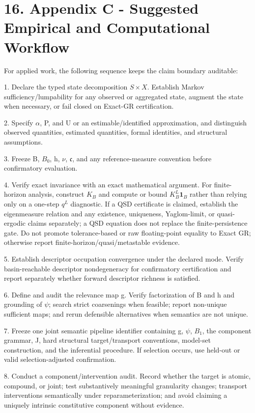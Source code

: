 \documentclass[10pt]{article}
\begin{document}
\section{16. Appendix C - Suggested Empirical and Computational
Workflow}\label{appendix-c---suggested-empirical-and-computational-workflow}

For applied work, the following sequence keeps the claim boundary
auditable:

1. Declare the typed state decomposition \(S\times{}X\). Establish
Markov sufficiency/lumpability for any observed or aggregated state,
augment the state when necessary, or fail closed on Exact-GR
certification.

2. Specify \(\alpha\), P, and U or an estimable/identified
approximation, and distinguish observed quantities, estimated
quantities, formal identities, and structural assumptions.

3. Freeze B, \(B_0\), h, \(\nu\), \(\mathfrak c\), and any
reference-measure convention before confirmatory evaluation.

4. Verify exact invariance with an exact mathematical argument. For finite-horizon analysis, construct $K_B$ and compute or bound $K_B^L\mathbf1_B$ rather than relying only on a one-step $q^L$ diagnostic. If a QSD certificate is claimed, establish the eigenmeasure relation and any existence, uniqueness, Yaglom-limit, or quasi-ergodic claims separately; a QSD equation does not replace the finite-persistence gate. Do not promote tolerance-based or raw floating-point equality to Exact GR; otherwise report finite-horizon/quasi/metastable evidence.

5. Establish descriptor occupation convergence under the declared mode.
Verify basin-reachable descriptor nondegeneracy for confirmatory
certification and report separately whether forward descriptor richness
is satisfied.

6. Define and audit the relevance map g. Verify factorization of B and h
and grounding of \(\psi\); search strict coarsenings when feasible;
report non-unique sufficient maps; and rerun defensible alternatives
when semantics are not unique.

7. Freeze one joint semantic pipeline identifier containing g, \(\psi\),
\(B_1\), the component grammar, J, hard structural target/transport
conventions, model-set construction, and the inferential procedure. If
selection occurs, use held-out or valid selection-adjusted confirmation.

8. Conduct a component/intervention audit. Record whether the target is
atomic, compound, or joint; test substantively meaningful granularity
changes; transport interventions semantically under reparameterization;
and avoid claiming a uniquely intrinsic constitutive component without
evidence.
\end{document}
